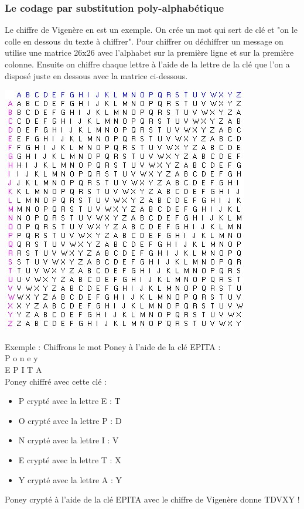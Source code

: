 \documentclass[a4paper,12pt]{article}
\begin{document}
	\subsubsection{Le codage par substitution poly-alphabétique}
	Le chiffre de Vigenère en est un exemple. On crée un mot qui sert de clé et "on le colle en dessous du texte à chiffrer". Pour chiffrer ou déchiffrer un message on utilise une matrice 26x26 avec l'alphabet sur la première ligne et sur la première colonne. Ensuite on chiffre chaque lettre à l'aide de la lettre de la clé que l'on a disposé juste en dessous avec la matrice ci-dessous.
\begin{center}
	\includegraphics[scale=0.75]{../Image/matrice.jpg}  
\end{center}
	Exemple : Chiffrons le mot Poney à l'aide de la clé EPITA : \\ P o n e y \\E P I T A \\
	Poney chiffré avec cette clé : 
\begin{itemize}
\item P crypté avec la lettre E : T
\item O crypté avec la lettre P : D
\item N crypté avec la lettre I : V
\item E crypté avec la lettre T : X
\item Y crypté avec la lettre A : Y
\end{itemize}
	Poney crypté à l'aide de la clé EPITA avec le chiffre de Vigenère donne TDVXY !
\end{document}
